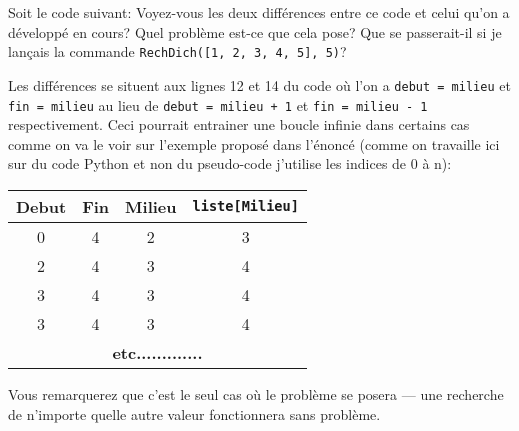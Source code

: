 \documentclass[12pt]{article}
\begin{document}
	\begin{MonExo}
		Soit le code suivant:
		Voyez-vous les deux différences entre ce code et celui qu'on a développé en cours? Quel problème est-ce que cela pose? Que se passerait-il si je lançais la commande \texttt{RechDich([1, 2, 3, 4, 5], 5)}?
	\end{MonExo}
	\begin{MaReponse}
		Les différences se situent aux lignes 12 et 14 du code où l'on a \texttt{debut = milieu} et \texttt{fin = milieu} au lieu de \texttt{debut = milieu + 1} et \texttt{fin = milieu - 1} respectivement. Ceci pourrait entrainer une boucle infinie dans certains cas comme on va le voir sur l'exemple proposé dans l'énoncé (comme on travaille ici sur du code Python et non du pseudo-code j'utilise les indices de 0 à n):
		
		\begin{tabular}{|c|c|c|c|}
			\hline
			\textbf{Debut} & \textbf{Fin} & \textbf{Milieu} & \textbf{\texttt{liste[Milieu]}}\\
			\hline
			0 & 4 & 2 & 3\\
			\hline 
			2 & 4 & 3 & 4 \\
			\hline 
			3 & 4 & 3 & 4 \\
			\hline
			3 & 4 & 3 & 4 \\
			\hline
			\multicolumn{4}{c}{\textbf{etc.............}} 
		\end{tabular}
		
		Vous remarquerez que c'est le seul cas où le problème se posera --- une recherche de n'importe quelle autre valeur fonctionnera sans problème.
	\end{MaReponse}
	
\end{document}
